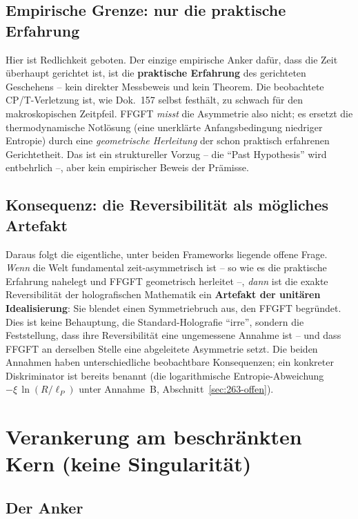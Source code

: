 \subsection*{Empirische Grenze: nur die praktische Erfahrung}

Hier ist Redlichkeit geboten. Der einzige empirische Anker dafür, dass die
Zeit überhaupt gerichtet ist, ist die \textbf{praktische Erfahrung} des
gerichteten Geschehens -- kein direkter Messbeweis und kein Theorem. Die
beobachtete CP/T-Verletzung ist, wie Dok.~157 selbst festhält, zu schwach für
den makroskopischen Zeitpfeil. FFGFT \emph{misst} die Asymmetrie also nicht;
es ersetzt die thermodynamische Notlösung (eine unerklärte Anfangsbedingung
niedriger Entropie) durch eine \emph{geometrische Herleitung} der schon
praktisch erfahrenen Gerichtetheit. Das ist ein struktureller Vorzug -- die
\enquote{Past Hypothesis} wird entbehrlich --, aber kein empirischer Beweis
der Prämisse.

\subsection*{Konsequenz: die Reversibilität als mögliches Artefakt}

Daraus folgt die eigentliche, unter beiden Frameworks liegende offene Frage.
\emph{Wenn} die Welt fundamental zeit-asymmetrisch ist -- so wie es die
praktische Erfahrung nahelegt und FFGFT geometrisch herleitet --, \emph{dann}
ist die exakte Reversibilität der holografischen Mathematik ein
\textbf{Artefakt der unitären Idealisierung}: Sie blendet einen Symmetriebruch
aus, den FFGFT begründet. Dies ist keine Behauptung, die Standard-Holografie
\enquote{irre}, sondern die Feststellung, dass ihre Reversibilität eine
ungemessene Annahme ist -- und dass FFGFT an derselben Stelle eine abgeleitete
Asymmetrie setzt. Die beiden Annahmen haben unterschiedliche beobachtbare
Konsequenzen; ein konkreter Diskriminator ist bereits benannt (die
logarithmische Entropie-Abweichung $-\xi\,\ln(R/\ell_P)$ unter Annahme~B,
Abschnitt~\ref{sec:263-offen}).

\section{Verankerung am beschränkten Kern (keine Singularität)}

\subsection*{Der Anker}

